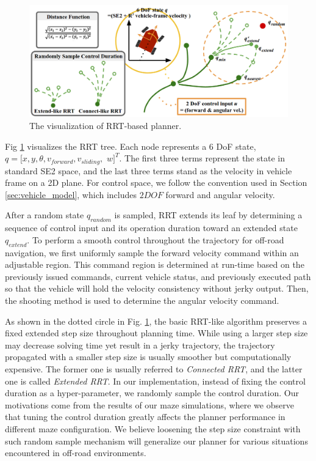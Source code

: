 \documentclass[../thesis.tex]{subfiles}
\begin{document}
\begin{figure}[t]
    	\begin{center}
    	 \centerline{\includegraphics[width=0.8\columnwidth]{./RRTPlanner/fig/rrt.png}}
           	\caption{The visualization of RRT-based planner.}
           	\label{fig:rrt}
    	\end{center}
\end{figure}
 
Fig \ref{fig:rrt} visualizes the RRT tree. 
Each node represents a $6$ DoF state, $q=[x,y, \theta ,v_{forward}, v_{sliding},$ $ w]^T$. 
The first three terms represent the state in standard SE2 space, and the last three terms stand as the velocity in vehicle frame on a 2D plane. 
For control space, we follow the convention used in Section \ref{sec:vehicle_model}, which includes $2DOF$ forward and angular velocity.
 
After a random state $q_{random}$ is sampled, RRT extends its leaf by determining a sequence of control input and its operation duration toward an extended state $q_{extend}$.
To perform a smooth control throughout the trajectory for off-road navigation, we first uniformly sample the forward velocity command within an adjustable region.
This command region is determined at run-time based on the previously issued commands, current vehicle status, and previously executed path so that the vehicle will hold the velocity consistency without jerky output.
Then, the shooting method is used to determine the angular velocity command.
 
As shown in the dotted circle in Fig. \ref{fig:rrt}, the basic RRT-like algorithm preserves a fixed extended step size throughout planning time.
While using a larger step size may decrease solving time yet result in a jerky trajectory, the trajectory propagated with a smaller step size is usually smoother but computationally expensive.
The former one is usually referred to \textit{Connected RRT}, and the latter one is called \textit{Extended RRT}.
In our implementation, instead of fixing the control duration as a hyper-parameter, we randomly sample the control duration.
Our motivations come from the results of our maze simulations, where we observe that tuning the control duration greatly affects the planner performance in different maze configuration.
We believe loosening the step size constraint with such random sample mechanism will generalize our planner for various situations encountered in off-road environments.
 
\end{document}
